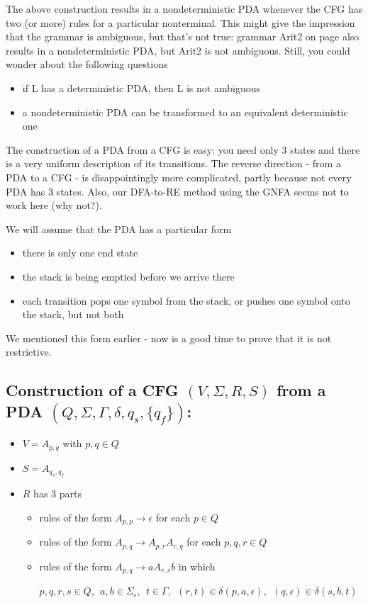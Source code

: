 The above construction results in a nondeterministic PDA whenever the
CFG has two (or more) rules for a particular nonterminal. This might
give the impression that the grammar is ambiguous, but that's not true: grammar
Arit2 on page \pageref{arit2label} also results in a nondeterministic
PDA, but Arit2 is not ambiguous. Still, you could wonder about the
following questions
\begin{itemize}
\item
if L has a deterministic PDA, then L is not ambiguous
\item
a nondeterministic PDA can be transformed to an equivalent
deterministic one
\end{itemize}


The construction of a PDA from a CFG is easy: you need only 3
states and there is a very uniform description of its transitions.
The reverse direction - from a PDA to a CFG - is disappointingly more
complicated, partly because not every PDA has 3 states. Also, our
DFA-to-RE method using the GNFA seems not to work here (why not?).


We will assume that the PDA has a particular form
\begin{itemize}
\item there is only one end state
\item the stack is being emptied before we arrive there
\item each transition pops one symbol from the stack, or pushes one
  symbol onto the stack, but not both
\end{itemize}
We mentioned this form earlier - now is a good time to prove that it
is not restrictive.


\subsection{Construction of a CFG $(V,\Sigma,R,S)$ from a PDA
$(Q,\Sigma,\Gamma,\delta,q_s,\{q_f\})$:}
\begin{itemize}
\item $V = A_{p,q}$ with $p, q \in Q$
\item $S = A_{q_s,q_f}$
\item $R$ has 3 parts
\begin{itemize}
\item rules of the form $A_{p,p} \rightarrow \epsilon$ for each $p \in Q$
\item rules of the form $A_{p,q} \rightarrow A_{p,r}A_{r,q}$ for each
  $p, q, r \in Q$
\item rules of the form $A_{p,q} \rightarrow aA_{r,s}b$ in which

$p, q, r, s \in Q, ~~
a,b \in \Sigma_\epsilon, ~~
t \in \Gamma,~~
(r,t) \in \delta(p,a,\epsilon),~~
(q,\epsilon) \in \delta(s,b,t)$
\end{itemize}

\end{itemize}

